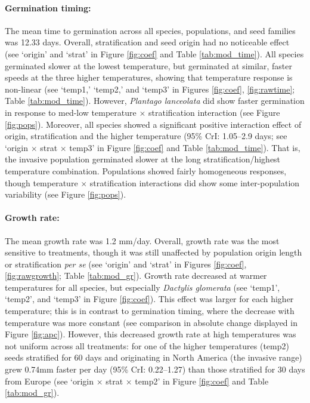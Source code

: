 \documentclass[12pt]{article}\usepackage[]{graphicx}\usepackage[]{color}
\begin{document}
	\paragraph{Germination timing:} The mean time to germination across all species, populations, and seed families was 12.33 days.   Overall, stratification and seed origin had no noticeable effect (see `origin' and `strat' in Figure \ref{fig:coef} and Table \ref{tab:mod_time}). All species germinated slower at the lowest temperature, but germinated at similar, faster speeds at the three higher temperatures, showing that temperature response is non-linear  (see `temp1,' `temp2,' and `temp3' in Figures \ref{fig:coef}, \ref{fig:rawtime}; Table \ref{tab:mod_time}). However, \textit{Plantago lanceolata} did show faster germination in response to med-low temperature $\times$ stratification interaction (see Figure \ref{fig:pops}).  Moreover, all species showed a significant positive interaction effect of origin, stratification and the higher temperature (95\% CrI: 1.05--2.9 days; see `origin $\times$ strat $\times$ temp3' in Figure \ref{fig:coef} and Table \ref{tab:mod_time}). That is, the invasive population germinated slower at the long stratification/highest temperature combination. Populations showed fairly homogeneous responses, though temperature $\times$ stratification interactions did show some inter-population variability (see Figure \ref{fig:pops}). 
	\paragraph{Growth rate:} The mean growth rate was 1.2 mm/day. Overall, growth rate was the most sensitive to treatments, though it was still unaffected by population origin length or stratification \textit{per se} (see `origin' and `strat' in Figures \ref{fig:coef}, \ref{fig:rawgrowth}; Table \ref{tab:mod_gr}). Growth rate decreased at warmer temperatures for all species, but especially \textit{Dactylis glomerata} (see `temp1', `temp2', and `temp3' in Figure \ref{fig:coef}). This effect was larger for each higher temperature; this is in contrast to germination timing, where the decrease with temperature was more constant (see comparison in absolute change displayed in Figure \ref{fig:apc}). However, this decreased growth rate at high temperatures was not uniform across all treatments: for one of the higher temperatures (temp2) seeds stratified for 60 days and originating in North America (the invasive range) grew 0.74mm faster per day (95\% CrI: 0.22--1.27) than those stratified for 30 days from Europe (see `origin $\times$ strat $\times$ temp2' in Figure \ref{fig:coef} and Table \ref{tab:mod_gr}). 
\end{document}
